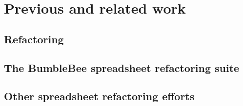 \documentclass[12pt,a4paper,onecolumn,oneside,parskip]{memoir}
\begin{document}
\chapter{Previous and related work}
\label{chapter:previouswork}

\section{Refactoring}

\section{The BumbleBee spreadsheet refactoring suite}

\section{Other spreadsheet refactoring efforts}


\end{document}
